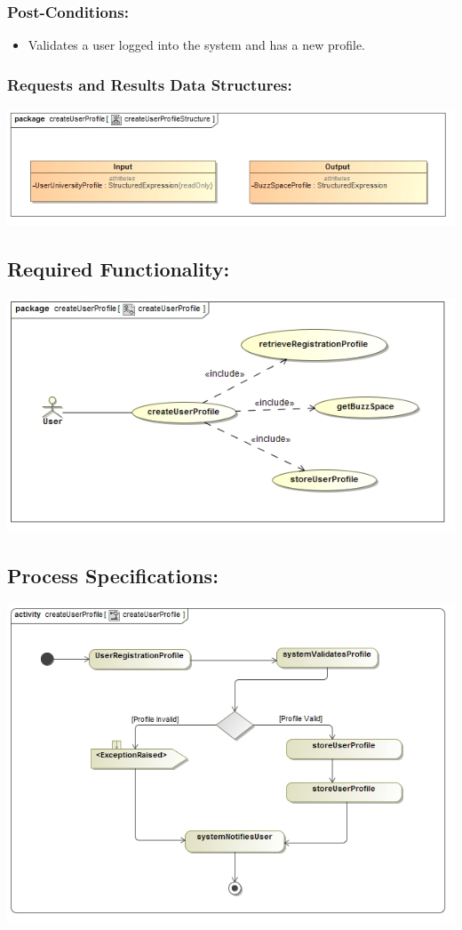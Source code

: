 \documentclass[a4paper,11pt]{article}
\begin{document}
\subsubsection*{Post-Conditions:}
\begin{itemize}
\item Validates a user logged into the system and has a new profile.
\end{itemize}
\subsubsection*{Requests and Results Data Structures:}
\includegraphics[width=1\linewidth]{./Images/UserProfile/CreateUserProfileStructure}
\subsection{Required Functionality:} 
\includegraphics[width=1\linewidth]{./Images/UserProfile/CreateUserProfileUseCase}
\subsection{Process Specifications:} 
\includegraphics[width=1\linewidth]{./Images/UserProfile/CreateUserProfileActivity}
\end{document}
